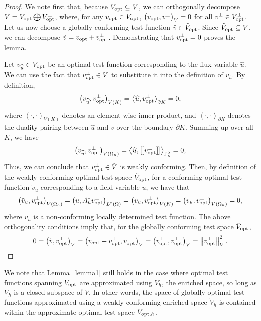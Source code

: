 \documentclass[11pt,onecolumn]{scrartcl}
\newcommand{\nor}[1]{\left\| #1 \right\|}
\newcommand{\LRp}[1]{\left( #1 \right)}
\newcommand{\LRs}[1]{\left[ #1 \right]}
\newcommand{\LRa}[1]{\left\langle #1 \right\rangle}
\newcommand{\jump}[1] {\ensuremath{\LRs{\!\left[#1\right]\!}}}
\newcommand{\uh}{\widehat{u}}
\newcommand{\Gh}{\Gamma_h}
\newcommand{\Oh}{\Omega_h}
\begin{document}
\begin{proof}
We note first that, because $V_{\rm opt} \subseteq V$, we can orthogonally decompose $V = V_{\rm opt} \bigoplus V_{\rm opt}^\perp$, where, for any $v_{\rm opt}\in V_{\rm opt}$, $\LRp{v_{\rm opt},v^\perp}_V = 0$ for all $v^\perp \in V_{\rm opt}^\perp$.  Let us now choose a globally conforming test function $\tilde{v}\in \tilde{V}_{\rm opt}$.  Since $\tilde{V}_{\rm opt} \subseteq V$, we can decompose $\tilde{v} = v_{\rm opt} + v_{\rm opt}^\perp$.  Demonstrating that $v_{\rm opt}^\perp = 0$ proves the lemma.  

Let $v_{\uh} \in V_{\rm opt}$ be an optimal test function corresponding to the flux variable $\uh$.  We can use the fact that $v_{\rm opt}^\perp \in V$ to substitute it into the definition of $v_{\uh}$.  By definition, 
\[
\LRp{v_{\uh},v_{\rm opt}^\perp}_{V(K)} = \LRa{\uh,v_{\rm opt}^\perp}_{\partial K} = 0,
\]
where $\LRp{\cdot,\cdot}_{V(K)}$ denotes an element-wise inner product, and $\LRa{\cdot,\cdot}_{\partial K}$ denotes the duality pairing between $\uh$ and $v$ over the boundary $\partial K$.  Summing up over all $K$, we have
\[
\LRp{v_{\uh},v_{\rm opt}^\perp}_{V(\Oh)} = \LRa{\uh,\jump{v_{\rm opt}^\perp}}_{\Gh^0} = 0,
\]
Thus, we can conclude that $v_{\rm opt}^\perp \in \tilde{V}$ is weakly conforming.  Then, by definition of the weakly conforming optimal test space $\tilde{V}_{\rm opt}$, for a conforming optimal test function $\tilde{v}_u$ corresponding to a field variable $u$, we have that
\[
\LRp{\tilde{v}_u,v_{\rm opt}^\perp}_{V(\Oh)} = \LRp{u,A^*_h v_{\rm opt}^\perp}_{L^2(\Omega)} = \LRp{v_u, v_{\rm opt}^\perp}_{V(K)} = \LRp{v_u, v_{\rm opt}^\perp}_{V(\Oh)} = 0,
\]
where $v_u$ is a non-conforming locally determined test function.  The above orthogonality conditions imply that, for the globally conforming test space $\tilde{V}_{\rm opt}$, 
\[
0 = \LRp{\tilde{v},v_{\rm opt}^\perp}_V = \LRp{v_{\rm opt} + v_{\rm opt}^\perp,v_{\rm opt}^\perp}_V = \LRp{v_{\rm opt}^\perp,v_{\rm opt}^\perp}_V = \nor{v_{\rm opt}^\perp}_V^2.
\]
\end{proof}

We note that Lemma~\ref{lemma1} still holds in the case where optimal test functions spanning $V_{\rm opt}$ are approximated using $V_h$, the enriched space, so long as $V_h$ is a closed subspace of $V$.  In other words, the space of globally optimal test functions approximated using a weakly conforming enriched space $\tilde{V}_h$ is contained within the approximate optimal test space $V_{{\rm opt},h}$.  
\end{document}
